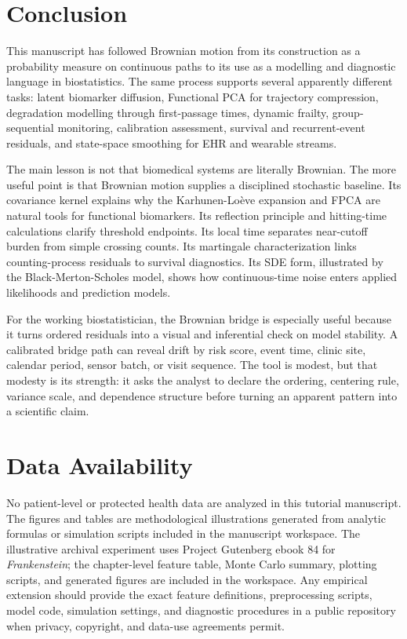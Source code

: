 \documentclass{article}
\theoremstyle{plain}
\theoremstyle{definition}
\begin{document}
\section{Conclusion}

This manuscript has followed Brownian motion from its construction as a
probability measure on continuous paths to its use as a modelling and
diagnostic language in biostatistics. The same process supports several
apparently different tasks: latent biomarker diffusion, Functional PCA for
trajectory compression, degradation modelling through first-passage times,
dynamic frailty, group-sequential monitoring, calibration assessment,
survival and recurrent-event residuals, and state-space smoothing for EHR
and wearable streams.

The main lesson is not that biomedical systems are literally Brownian. The
more useful point is that Brownian motion supplies a disciplined stochastic
baseline. Its covariance kernel explains why the Karhunen-Loève expansion
and FPCA are natural tools for functional biomarkers. Its reflection
principle and hitting-time calculations clarify threshold endpoints. Its
local time separates near-cutoff burden from simple crossing counts. Its
martingale characterization links counting-process residuals to survival
diagnostics. Its SDE form, illustrated by the Black-Merton-Scholes model,
shows how continuous-time noise enters applied likelihoods and prediction
models.

For the working biostatistician, the Brownian bridge is especially useful
because it turns ordered residuals into a visual and inferential check on
model stability. A calibrated bridge path can reveal drift by risk score,
event time, clinic site, calendar period, sensor batch, or visit sequence.
The tool is modest, but that modesty is its strength: it asks the analyst
to declare the ordering, centering rule, variance scale, and dependence
structure before turning an apparent pattern into a scientific claim.

\section*{Data Availability}

No patient-level or protected health data are analyzed in this tutorial
manuscript. The figures and tables are methodological illustrations
generated from analytic formulas or simulation scripts included in the
manuscript workspace. The illustrative archival experiment uses Project
Gutenberg ebook 84 for \emph{Frankenstein}; the chapter-level feature table,
Monte Carlo summary, plotting scripts, and generated figures are included in
the workspace. Any empirical extension should provide the exact feature
definitions, preprocessing scripts, model code, simulation settings, and
diagnostic procedures in a public repository when privacy, copyright, and
data-use agreements permit.
\end{document}
